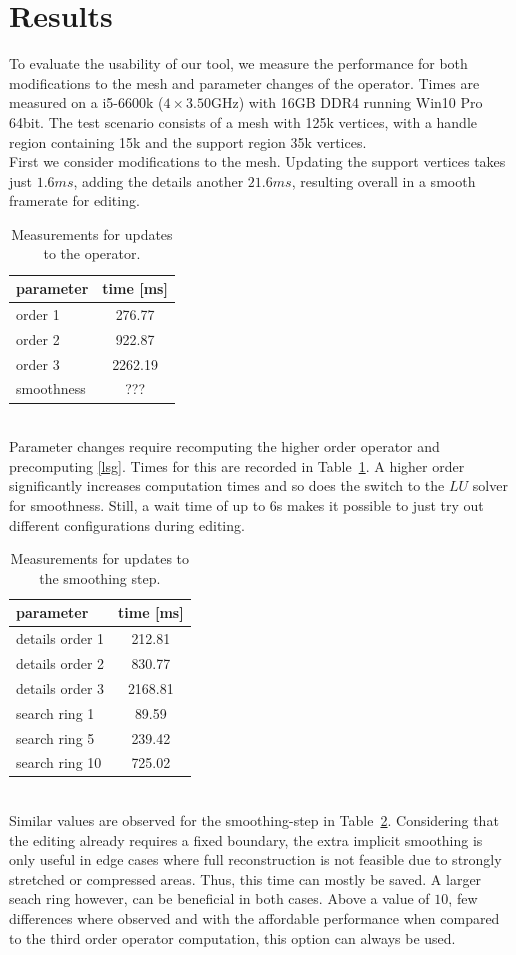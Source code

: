\documentclass[twocolumn]{article}
\begin{document}
\section{Results}
To evaluate the usability of our tool, we measure the performance for both modifications to the mesh and parameter changes of the operator.
Times are measured on a i5-6600k ($4 \times 3.50$GHz) with 16GB DDR4 running Win10 Pro 64bit.
The test scenario consists of a mesh with 125k vertices, with a handle region containing 15k and the support region 35k vertices. \\
First we consider modifications to the mesh. Updating the support vertices takes just $1.6\si{ms}$, adding the details another $21.6\si{ms}$, resulting overall in a smooth framerate for editing.
\begin{table}
	\centering
	\caption{Measurements for updates to the operator.}
	\begin{tabular}{lc}
		parameter & time [ms] \\
		\hline
		order 1 & 276.77 \\
		order 2 & 922.87 \\
		order 3 & 2262.19 \\
		smoothness & ??? \\
		\hline
	\end{tabular}
	\label{tab:order}
\end{table}\\
Parameter changes require recomputing the higher order operator and precomputing \eqref{lsg}. Times for this are recorded in Table~\ref{tab:order}. A higher order significantly increases computation times and so does the switch to the $LU$ solver for smoothness. Still, a wait time of up to 6s makes it possible to just try out different configurations during editing.
\begin{table}
	\centering
	\caption{Measurements for updates to the smoothing step.}
	\begin{tabular}{lc}
		parameter & time [ms] \\
		\hline
		details order 1 & 212.81 \\
		details order 2 & 830.77 \\
		details order 3 & 2168.81 \\
		search ring 1 & 89.59 \\
		search ring 5 & 239.42 \\
		search ring 10 & 725.02 \\
		\hline
	\end{tabular}
	\label{tab:smoothing}
\end{table}\\
Similar values are observed for the smoothing-step in Table~\ref{tab:smoothing}.
Considering that the editing already requires a fixed boundary, the extra implicit smoothing is only useful in edge cases where full reconstruction is not feasible due to strongly stretched or compressed areas. Thus, this time can mostly be saved. A larger seach ring however, can be beneficial in both cases. Above a value of $10$, few differences where observed and with the affordable performance when compared to the third order operator computation, this option can always be used.



\end{document}
